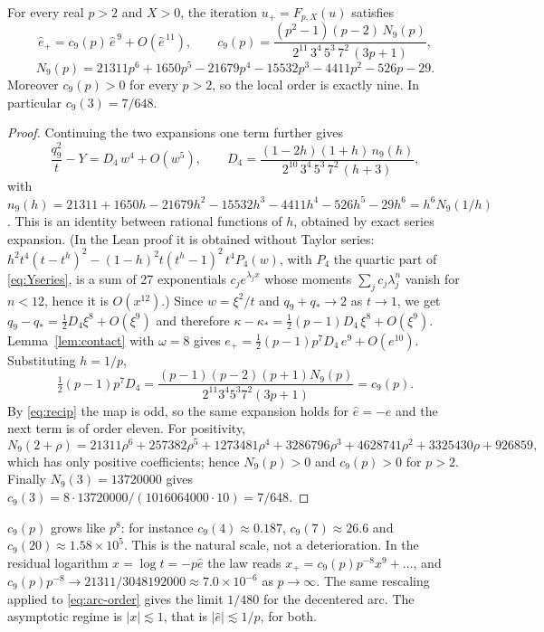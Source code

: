 \begin{theorem}\label{thm:order9}
For every real $p>2$ and $X>0$, the iteration $u_+=F_{p,X}(u)$ satisfies
\begin{equation}\label{eq:c9}
\hat e_+=c_9(p)\,\hat e^{\,9}+O(\hat e^{\,11}),\qquad
c_9(p)=\frac{(p^{2}-1)(p-2)\,N_9(p)}{2^{11}\,3^{4}\,5^{3}\,7^{2}\,(3p+1)},
\end{equation}
\[ N_9(p)=21311p^{6}+1650p^{5}-21679p^{4}-15532p^{3}-4411p^{2}-526p-29 . \]
Moreover $c_9(p)>0$ for every $p>2$, so the local order is exactly nine. In particular
$c_9(3)=7/648$.
\end{theorem}

\begin{proof}
Continuing the two expansions one term further gives
\begin{equation}\label{eq:D4}
\frac{q_9^{2}}{t}-Y=D_4\,w^{4}+O(w^{5}),\qquad
D_4=\frac{(1-2h)(1+h)\,n_9(h)}{2^{10}\,3^{4}\,5^{3}\,7^{2}\,(h+3)},
\end{equation}
with $n_9(h)=21311+1650h-21679h^{2}-15532h^{3}-4411h^{4}-526h^{5}-29h^{6}=h^{6}N_9(1/h)$. This is an
identity between rational functions of $h$, obtained by exact series expansion. (In the Lean proof it
is obtained without Taylor series: $h^{2}t^{4}(t-t^{h})^{2}-(1-h)^{2}t(t^{h}-1)^{2}\,t^{4}P_4(w)$, with
$P_4$ the quartic part of \eqref{eq:Yseries}, is a sum of 27 exponentials $c_je^{\lambda_jx}$ whose
moments $\sum_jc_j\lambda_j^{n}$ vanish for $n<12$, hence it is $O(x^{12})$.) Since $w=\xi^{2}/t$ and
$q_9+q_*\to2$ as $t\to1$, we get $q_9-q_*=\tfrac12D_4\xi^{8}+O(\xi^{9})$ and therefore
$\kappa-\kappa_*=\tfrac12(p-1)D_4\,\xi^{8}+O(\xi^{9})$. Lemma~\ref{lem:contact} with $\omega=8$ gives
$e_+=\tfrac12(p-1)p^{7}D_4\,e^{9}+O(e^{10})$. Substituting $h=1/p$,
\[ \tfrac12(p-1)p^{7}D_4=\frac{(p-1)(p-2)(p+1)N_9(p)}{2^{11}3^{4}5^{3}7^{2}(3p+1)}=c_9(p). \]
By \eqref{eq:recip} the map is odd, so the same expansion holds for $\hat e=-e$ and the next term is of
order eleven. For positivity,
\[ N_9(2+\rho)=21311\rho^{6}+257382\rho^{5}+1273481\rho^{4}+3286796\rho^{3}+4628741\rho^{2}+3325430\rho+926859, \]
which has only positive coefficients; hence $N_9(p)>0$ and $c_9(p)>0$ for $p>2$. Finally
$N_9(3)=13720000$ gives $c_9(3)=8\cdot13720000/(1016064000\cdot10)=7/648$.
\end{proof}

\begin{remark}\label{rem:scale}
$c_9(p)$ grows like $p^{8}$: for instance $c_9(4)\approx0.187$, $c_9(7)\approx26.6$ and
$c_9(20)\approx1.58\times10^{5}$. This is the natural scale, not a deterioration. In the residual
logarithm $x=\log t=-p\hat e$ the law reads $x_+=c_9(p)p^{-8}x^{9}+\dots$, and
$c_9(p)p^{-8}\to21311/3048192000\approx7.0\times10^{-6}$ as $p\to\infty$. The same rescaling applied
to \eqref{eq:arc-order} gives the limit $1/480$ for the decentered arc. The asymptotic regime is
$|x|\lesssim1$, that is $|\hat e|\lesssim1/p$, for both.
\end{remark}

